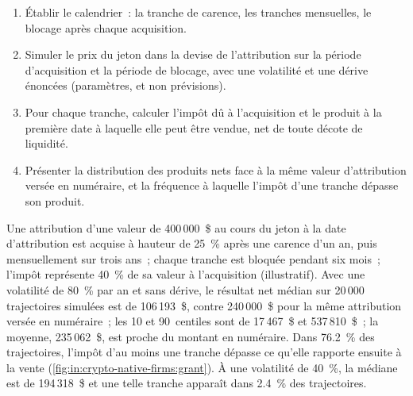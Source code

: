 \begin{method}\label{met:in:crypto-native-firms:grant}
\begin{enumerate}
\item Établir le calendrier~: la tranche de carence, les tranches mensuelles, le blocage après chaque acquisition.
\item Simuler le prix du jeton dans la devise de l'attribution sur la période d'acquisition et la période de blocage, avec une volatilité et une dérive
énoncées (paramètres, et non prévisions).
\item Pour chaque tranche, calculer l'impôt dû à l'acquisition et le produit à la première date à laquelle elle peut être vendue, net de toute
décote de liquidité.
\item Présenter la distribution des produits nets face à la même valeur d'attribution versée en numéraire, et la fréquence à laquelle l'impôt d'une tranche
dépasse son produit.
\end{enumerate}
\end{method}

\begin{example}\label{ex:in:crypto-native-firms:grant}
Une attribution d'une valeur de 400\,000~\$ au cours du jeton à la date d'attribution est acquise à hauteur de 25~\% après une carence d'un an, puis mensuellement sur
trois ans~; chaque tranche est bloquée pendant six mois~; l'impôt représente 40~\% de sa valeur à l'acquisition (illustratif). Avec une
volatilité de 80~\% par an et sans dérive, le résultat net médian sur 20\,000 trajectoires simulées est de 106\,193~\$, contre 240\,000~\$
pour la même attribution versée en numéraire~; les 10 et 90~centiles sont de 17\,467~\$ et 537\,810~\$~; la moyenne, 235\,062~\$, est proche
du montant en numéraire. Dans 76.2~\% des trajectoires, l'impôt d'au moins une tranche dépasse ce qu'elle rapporte ensuite à la vente
(\cref{fig:in:crypto-native-firms:grant}). À une volatilité de 40~\%, la médiane est de 194\,318~\$ et une telle tranche apparaît dans
2.4~\% des trajectoires.
\end{example}

